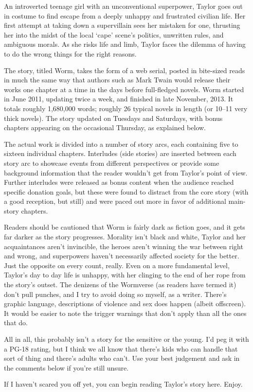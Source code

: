 An introverted teenage girl with an unconventional superpower, Taylor goes out in costume to find escape from a deeply unhappy and frustrated civilian life. Her first attempt at taking down a supervillain sees her mistaken for one, thrusting her into the midst of the local ‘cape’ scene’s politics, unwritten rules, and ambiguous morals. As she risks life and limb, Taylor faces the dilemma of having to do the wrong things for the right reasons.

The story, titled Worm, takes the form of a web serial, posted in bite-sized reads in much the same way that authors such as Mark Twain would release their works one chapter at a time in the days before full-fledged novels.  Worm started in June 2011, updating twice a week, and finished in late November, 2013.  It totals roughly 1,680,000 words; roughly 26 typical novels in length (or 10--11 very thick novels).  The story updated on Tuesdays and Saturdays, with bonus chapters appearing on the occasional Thursday, as explained below.

The actual work is divided into a number of story arcs, each containing five to sixteen individual chapters.  Interludes (side stories) are inserted between each story arc to showcase events from different perspectives or provide some background information that the reader wouldn’t get from Taylor’s point of view.  Further interludes were released as bonus content when the audience reached specific donation goals, but these were found to distract from the core story (with a good reception, but still) and were paced out more in favor of additional main-story chapters.

Readers should be cautioned that Worm is fairly dark as fiction goes, and it gets far darker as the story progresses.  Morality isn’t black and white, Taylor and her acquaintances aren’t invincible, the heroes aren’t winning the war between right and wrong, and superpowers haven’t necessarily affected society for the better.  Just the opposite on every count, really.  Even on a more fundamental level, Taylor’s day to day life is unhappy, with her clinging to the end of her rope from the story’s outset.  The denizens of the Wormverse (as readers have termed it) don’t pull punches, and I try to avoid doing so myself, as a writer.  There’s graphic language, descriptions of violence and sex does happen (albeit offscreen).  It would be easier to note the trigger warnings that don’t apply than all the ones that do.

All in all, this probably isn’t a story for the sensitive or the young.  I’d peg it with a PG-18 rating, but I think we all know that there’s kids who can handle that sort of thing and there’s adults who can’t.  Use your best judgement and ask in the comments below if you’re still unsure.

If I haven’t scared you off yet, you can begin reading Taylor’s story here.  Enjoy.